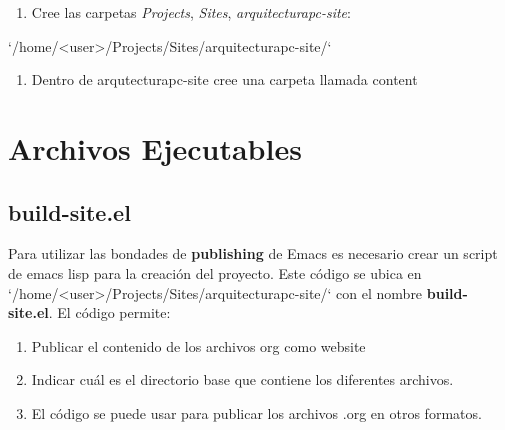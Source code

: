 \documentclass{article}
\begin{document}
\begin{enumerate}
\item Cree las carpetas \emph{Projects}, \emph{Sites}, \emph{arquitecturapc-site}:
\end{enumerate}
`/home/<user>/Projects/Sites/arquitecturapc-site/`

\begin{enumerate}
\item Dentro de arqutecturapc-site cree una carpeta llamada content
\end{enumerate}
\section{Archivos Ejecutables}
\label{sec:org18355f1}

\subsection{build-site.el}
\label{sec:orgb1954cf}

Para utilizar las bondades de \textbf{publishing} de Emacs es necesario crear
un script de emacs lisp para la creación del proyecto. Este código se
ubica en `/home/<user>/Projects/Sites/arquitecturapc-site/` con el
nombre \textbf{build-site.el}. El código permite:

\begin{enumerate}
\item Publicar el contenido de los archivos org como website
\item Indicar cuál es el directorio base que contiene los diferentes
archivos.
\item El código se puede usar para publicar los archivos .org en otros
formatos.
\end{enumerate}
\end{document}
